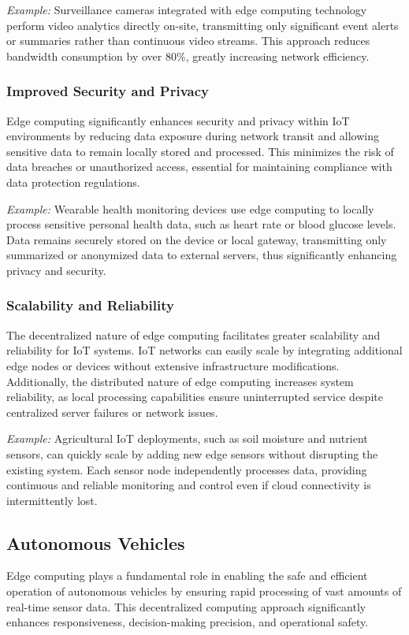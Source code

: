 \documentclass[runningheads]{llncs}
\begin{document}
\textit{Example:} Surveillance cameras integrated with edge computing technology perform video analytics directly on-site, transmitting only significant event alerts or summaries rather than continuous video streams. This approach reduces bandwidth consumption by over 80\%, greatly increasing network efficiency.

\subsubsection{Improved Security and Privacy}
Edge computing significantly enhances security and privacy within IoT environments by reducing data exposure during network transit and allowing sensitive data to remain locally stored and processed. This minimizes the risk of data breaches or unauthorized access, essential for maintaining compliance with data protection regulations.

\textit{Example:} Wearable health monitoring devices use edge computing to locally process sensitive personal health data, such as heart rate or blood glucose levels. Data remains securely stored on the device or local gateway, transmitting only summarized or anonymized data to external servers, thus significantly enhancing privacy and security.

\subsubsection{Scalability and Reliability}
The decentralized nature of edge computing facilitates greater scalability and reliability for IoT systems. IoT networks can easily scale by integrating additional edge nodes or devices without extensive infrastructure modifications. Additionally, the distributed nature of edge computing increases system reliability, as local processing capabilities ensure uninterrupted service despite centralized server failures or network issues.

\textit{Example:} Agricultural IoT deployments, such as soil moisture and nutrient sensors, can quickly scale by adding new edge sensors without disrupting the existing system. Each sensor node independently processes data, providing continuous and reliable monitoring and control even if cloud connectivity is intermittently lost.
\subsection{Autonomous Vehicles}

Edge computing plays a fundamental role in enabling the safe and efficient operation of autonomous vehicles by ensuring rapid processing of vast amounts of real-time sensor data. This decentralized computing approach significantly enhances responsiveness, decision-making precision, and operational safety.
\end{document}
